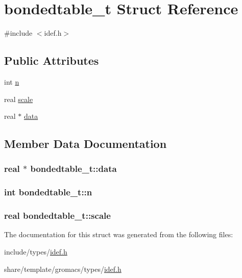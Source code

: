 \hypertarget{structbondedtable__t}{\section{bondedtable\-\_\-t \-Struct \-Reference}
\label{structbondedtable__t}
}


{\ttfamily \#include $<$idef.\-h$>$}

\subsection*{\-Public \-Attributes}
\begin{DoxyCompactItemize}
\item 
int \hyperlink{structbondedtable__t_a157fdd69cce7ac4627885964d5a0e08c}{n}
\item 
real \hyperlink{structbondedtable__t_a2d117de676446eca1664b7eb0b8ba426}{scale}
\item 
real $\ast$ \hyperlink{structbondedtable__t_a7a5e57b4b5d44e400a7eeb197e1c3a20}{data}
\end{DoxyCompactItemize}


\subsection{\-Member \-Data \-Documentation}
\hypertarget{structbondedtable__t_a7a5e57b4b5d44e400a7eeb197e1c3a20}{
\subsubsection[{data}]{\setlength{\rightskip}{0pt plus 5cm}real $\ast$ {\bf bondedtable\-\_\-t\-::data}}}\label{structbondedtable__t_a7a5e57b4b5d44e400a7eeb197e1c3a20}
\hypertarget{structbondedtable__t_a157fdd69cce7ac4627885964d5a0e08c}{
\subsubsection[{n}]{\setlength{\rightskip}{0pt plus 5cm}int {\bf bondedtable\-\_\-t\-::n}}}\label{structbondedtable__t_a157fdd69cce7ac4627885964d5a0e08c}
\hypertarget{structbondedtable__t_a2d117de676446eca1664b7eb0b8ba426}{
\subsubsection[{scale}]{\setlength{\rightskip}{0pt plus 5cm}real {\bf bondedtable\-\_\-t\-::scale}}}\label{structbondedtable__t_a2d117de676446eca1664b7eb0b8ba426}


\-The documentation for this struct was generated from the following files\-:\begin{DoxyCompactItemize}
\item 
include/types/\hyperlink{include_2types_2idef_8h}{idef.\-h}\item 
share/template/gromacs/types/\hyperlink{share_2template_2gromacs_2types_2idef_8h}{idef.\-h}\end{DoxyCompactItemize}
